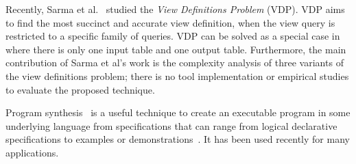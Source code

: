 Recently, Sarma et al.~\cite{DasSarma:2010} studied the \textit{View Definitions Problem} (VDP).
VDP aims to find the most
succinct and accurate view definition, when
the view query is restricted to a specific family of queries.
VDP can be solved as a special case in \ourtool where there is only one
input table and one output table. Furthermore, the main contribution
of Sarma et al's work is the complexity analysis of
three variants of the view definitions problem; there is no
tool implementation or empirical studies to evaluate
the proposed technique.







Program synthesis~\cite{Gulwani:2010:DPS} is a useful
technique to create an executable program
in some underlying language from specifications that can range
from logical declarative specifications to examples or
demonstrations~\cite{Harris:2011, singh:2012, Gulwani:2011,
Kandel:2011, Fisher08Pads,Lau:2003:PDU, Lau:2000:VSA, Barbosa:2010:MLA, Arasu:2009:LST}.
It has been used recently for many applications.


